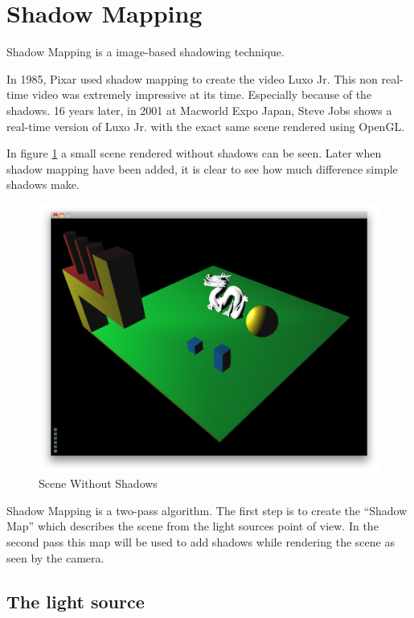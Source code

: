 
\section{Shadow Mapping}

Shadow Mapping is a image-based shadowing technique.


In 1985, Pixar used shadow mapping to create the video Luxo Jr. This
non real-time video was extremely impressive at its time. Especially
because of the shadows. 16 years later, in 2001 at Macworld Expo
Japan, Steve Jobs shows a real-time version of Luxo Jr. with the
exact same scene rendered using OpenGL.

In figure \ref{fig:scene} a small scene rendered without shadows can
be seen. Later when shadow mapping have been added, it is clear to see
how much difference simple shadows make.

\begin{figure}[h]
  \centering
  \includegraphics[width=\textwidth]{gfx/scenenoshadow}  
  \caption{Scene Without Shadows}
  \label{fig:scene}
\end{figure}

Shadow Mapping is a two-pass algorithm. The first step is to create
the ``Shadow Map'' which describes the scene from the light sources
point of view. In the second pass this map will be used to add shadows
while rendering the scene as seen by the camera.


\subsection{The light source}

